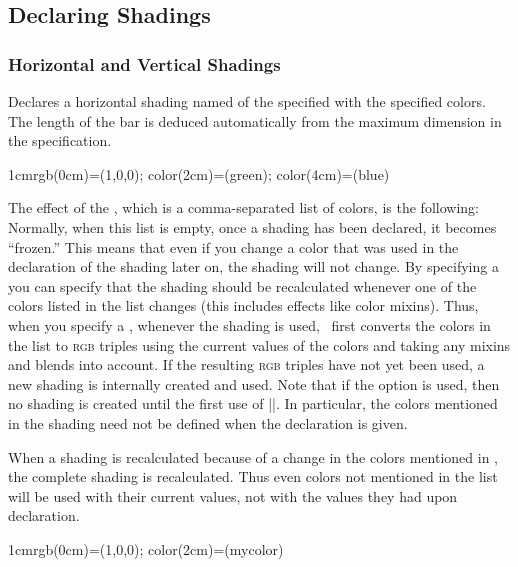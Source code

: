\subsection{Declaring Shadings}

\subsubsection{Horizontal and Vertical Shadings}

\begin{command}{\pgfdeclarehorizontalshading{}}
  Declares a horizontal shading named  of the specified
   with the specified colors. The length of the bar is
  deduced automatically from the maximum dimension in the specification.

\begin{codeexample}[]
  {1cm}{rgb(0cm)=(1,0,0); color(2cm)=(green); color(4cm)=(blue)}
\end{codeexample}

  The effect of the , which is a
  comma-separated list of colors, is the following: Normally, when
  this list is empty, once a shading has been declared, it becomes
  ``frozen.'' This means that even if you change a color that was used
  in the declaration of the shading later on, the shading will not
  change. By specifying a  you can specify
  that the shading should be recalculated whenever one of the colors
  listed in the list changes (this includes effects like color
  mixins). Thus, when you specify a ,
  whenever the shading is used, \pgfname\ first converts the colors in the
  list to \textsc{rgb} triples using the current values of the
  colors and taking any mixins and blends into account. If the
  resulting \textsc{rgb} triples have not yet been   used, a new
  shading is internally created and used. Note that if the 
  option  is used, then no shading is created until
  the first use of |\pgfuseshading|. In particular, the colors
  mentioned in the shading need not be defined when the declaration is
  given.

  When a shading is recalculated because of a change in the
  colors mentioned in , the complete shading
  is recalculated. Thus even colors not mentioned in the list will be
  used with their current values, not with the values they had upon
  declaration.
  
\begin{codeexample}[]
  {1cm}{rgb(0cm)=(1,0,0); color(2cm)=(mycolor)}
\end{codeexample}
\end{command}


